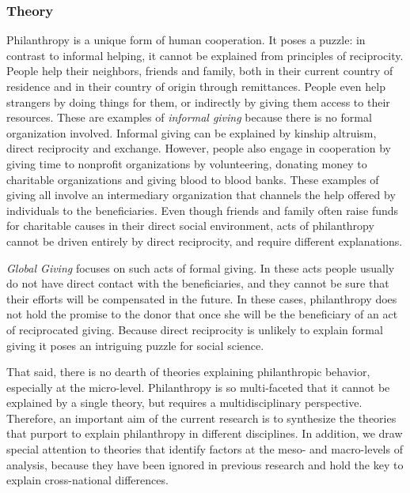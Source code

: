 \documentclass[twocolumn, serif, rga, numeric]{jote-article}
\begin{document}
 {}\subsubsection*{Theory} 

Philanthropy is a unique form of human cooperation. It poses a puzzle: in contrast to informal helping, it cannot be explained from principles of reciprocity.\cite{Rand2015} People help their neighbors, friends and family, both in their current country of residence and in their country of origin through remittances. People even help strangers by doing things for them, or indirectly by giving them access to their resources. These are examples of \emph{informal giving} because there is no formal organization involved. Informal giving can be explained by kinship altruism,\cite{Dawkins1976, Hamilton1964} direct reciprocity and exchange.\cite{Blau1964, Homans1958} However, people also engage in cooperation by giving time to nonprofit organizations by volunteering, donating money to charitable organizations and giving blood to blood banks. These examples of giving all involve an intermediary organization that channels the help offered by individuals to the beneficiaries. Even though friends and family often raise funds for charitable causes in their direct social environment, acts of philanthropy cannot be driven entirely by direct reciprocity, and require different explanations.\cite{Moody2008, Gouldner1960, Gouldner1973}

\emph{Global Giving} focuses on such acts of formal giving. In these acts people usually do not have direct contact with the beneficiaries, and they cannot be sure that their efforts will be compensated in the future. In these cases, philanthropy does not hold the promise to the donor that once she will be the beneficiary of an act of reciprocated giving. Because direct reciprocity is unlikely to explain formal giving it poses an intriguing puzzle for social science.

That said, there is no dearth of theories explaining philanthropic behavior, especially at the micro-level. Philanthropy is so multi-faceted that it cannot be explained by a single theory, but requires a multidisciplinary perspective.\cite{Brown1997, Dovidio2006}
Therefore, an important aim of the current research is to synthesize the theories that purport to explain philanthropy in different disciplines.
In addition, we draw special attention to theories that identify factors at the meso- and macro-levels of analysis, because they have been ignored in previous research and hold the key to explain cross-national differences.
\end{document}
